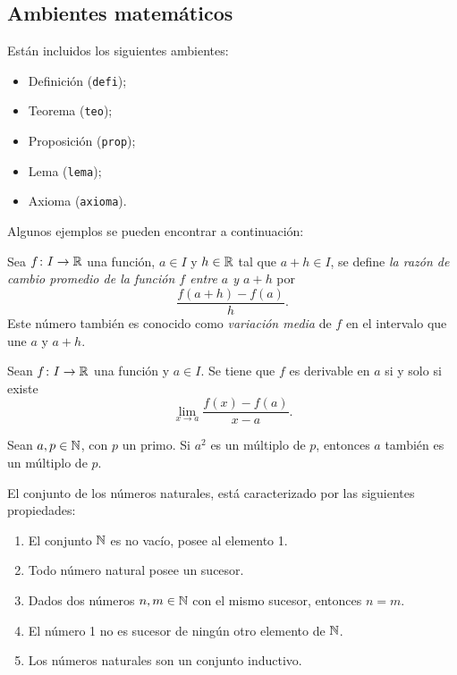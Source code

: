 \documentclass{aleph-revista}
\begin{document}
\subsection{Ambientes matemáticos}
Están incluidos los siguientes ambientes:
\begin{itemize}
    \item Definición (\texttt{defi});
    \item Teorema (\texttt{teo});
    \item Proposición (\texttt{prop});
    \item Lema (\texttt{lema});
    \item Axioma (\texttt{axioma}).
\end{itemize}
Algunos ejemplos se pueden encontrar a continuación:

\begin{defi}
    Sea $f\colon I \rightarrow \mathbb{R}$ una función, $a\in I$ y $h\in\mathbb{R}$ tal que $a+h\in I$, se define \emph{la razón de cambio promedio de la función $f$ entre $a$ y $a+h$} por
    \[
        \frac{f(a+h)-f(a)}{h}.
    \]
    Este número también es conocido como \emph{variación media} de $f$ en el intervalo que une $a$ y $a + h$.
\end{defi}

\begin{prop}
    Sean $f\colon I \rightarrow \mathbb{R}$ una función y $a\in I$. Se tiene que $f$ es derivable en $a$ si y solo si existe
    \[
        \lim_{x\to a}\frac{f(x)-f(a)}{x-a}.
    \]
\end{prop}

\begin{lem}
    Sean $a,p\in\mathbb{N}$, con $p$ un primo. Si $a^2$ es un múltiplo de $p$, entonces $a$ también es un múltiplo de $p$.
\end{lem}

\begin{axioma}
    El conjunto de los números naturales, está caracterizado por las siguientes propiedades:
    \begin{enumerate}
    \item
        El conjunto $\mathbb{N}$ es no vacío, posee al elemento 1.
    \item
        Todo número natural posee un sucesor.
    \item
        Dados dos números $n,m\in\mathbb{N}$ con el mismo sucesor, entonces $n=m$.
    \item
        El número 1 no es sucesor de ningún otro elemento de $\mathbb{N}$.
    \item
        Los números naturales son un conjunto inductivo.
    \end{enumerate}
\end{axioma}
\end{document}
